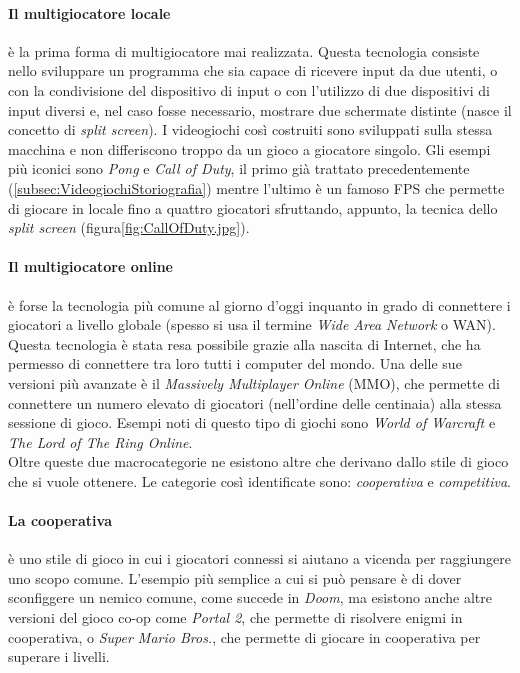         \paragraph{Il multigiocatore locale} è la prima forma di multigiocatore mai realizzata. Questa tecnologia consiste nello sviluppare un programma che sia
            capace di ricevere input da due utenti, o con la condivisione del dispositivo di input o con l'utilizzo di due dispositivi di input diversi e, nel caso
            fosse necessario, mostrare due schermate distinte (nasce il concetto di \textit{split screen}). I videogiochi così costruiti sono sviluppati sulla stessa macchina 
            e non differiscono troppo da un gioco a giocatore singolo\cite{glazer2015}. Gli esempi più iconici sono \textit{Pong} e \textit{Call of Duty}, il primo già trattato precedentemente (\ref{subsec:VideogiochiStoriografia})
            mentre l'ultimo è un famoso FPS che permette di giocare in locale fino a quattro giocatori sfruttando, appunto, la tecnica dello \textit{split screen} 
            (figura\ref{fig:CallOfDuty.jpg}). 

        \paragraph{Il multigiocatore online} è forse la tecnologia più comune al giorno d'oggi inquanto in grado di connettere i giocatori a livello globale (spesso si usa il termine
            \textit{Wide Area Network} o WAN). Questa tecnologia è stata resa possibile grazie alla nascita di Internet, che ha permesso di connettere tra loro tutti i computer del 
            mondo. Una delle sue versioni più avanzate è il \textit{Massively Multiplayer Online} (MMO), che permette di connettere un numero elevato di giocatori (nell'ordine delle
            centinaia) alla stessa sessione di gioco. Esempi noti di questo tipo di giochi sono \textit{World of Warcraft} e \textit{The Lord of The Ring Online}.\\

        Oltre queste due macrocategorie ne esistono altre che derivano dallo stile di gioco che si vuole ottenere. Le categorie così identificate sono: \textit{cooperativa} e
        \textit{competitiva}.

        \paragraph{La cooperativa} è uno stile di gioco in cui i giocatori connessi si aiutano a vicenda per raggiungere uno scopo comune. L'esempio più semplice a cui si può pensare
            è di dover sconfiggere un nemico comune, come succede in \textit{Doom}, ma esistono anche altre versioni del gioco co-op come \textit{Portal 2}, che permette di
            risolvere enigmi in cooperativa, o \textit{Super Mario Bros.}, che permette di giocare in cooperativa per superare i livelli.\\
        
